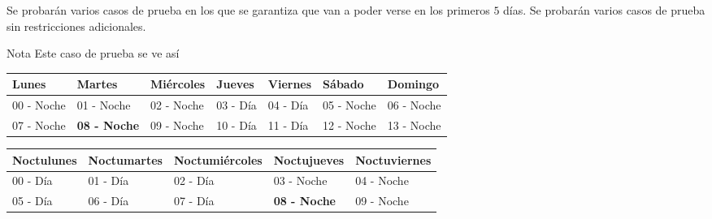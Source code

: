 \documentclass{oci}
\begin{document}
\begin{scoreDescription}
   Se probarán varios casos de prueba en los que se garantiza que van a poder verse en los primeros $5$ días.
   Se probarán varios casos de prueba sin restricciones adicionales.
\end{scoreDescription}

\begin{sampleDescription}

Nota
Este caso de prueba se ve así
\begin{table}[h]
\begin{tabular}{|l|l|l|l|l|l|l|}
\hline
Lunes      & Martes                             & Miércoles                          & Jueves   & Viernes  & Sábado     & Domingo    \\ \hline
00 - Noche & 01 - Noche                         & 02 - Noche                         & 03 - Día & 04 - Día & 05 - Noche & 06 - Noche \\ \hline
07 - Noche & \textbf{08 - Noche} & 09 - Noche & 10 - Día & 11 - Día & 12 - Noche & 13 - Noche \\ \hline
\end{tabular}
\end{table}

\begin{table}[h]
\begin{tabular}{|l|l|l|l|l|}
\hline
Noctulunes & Noctumartes & Noctumiércoles & Noctujueves         & Noctuviernes \\ \hline
00 - Día   & 01 - Día    & 02 - Día       & 03 - Noche          & 04 - Noche   \\ \hline
05 - Día   & 06 - Día    & 07 - Día       & \textbf{08 - Noche} & 09 - Noche   \\ \hline
\end{tabular}
\end{table}

\end{sampleDescription}
\end{document}
